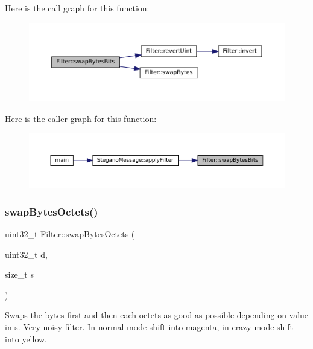 Here is the call graph for this function\+:\nopagebreak
\begin{figure}[H]
\begin{center}
\leavevmode
\includegraphics[width=350pt]{classFilter_a42c3e8f730c64a1bcdf187dc0a09082d_cgraph}
\end{center}
\end{figure}
Here is the caller graph for this function\+:\nopagebreak
\begin{figure}[H]
\begin{center}
\leavevmode
\includegraphics[width=350pt]{classFilter_a42c3e8f730c64a1bcdf187dc0a09082d_icgraph}
\end{center}
\end{figure}
\mbox{\label{classFilter_a55c046859fbbb468536cae5c1f95c702}} 
\subsubsection{\texorpdfstring{swapBytesOctets()}{swapBytesOctets()}}
{\footnotesize\ttfamily uint32\+\_\+t Filter\+::swap\+Bytes\+Octets (\begin{DoxyParamCaption}\item[{uint32\+\_\+t}]{d,  }\item[{size\+\_\+t}]{s }\end{DoxyParamCaption})\hspace{0.3cm}{\ttfamily [static]}}



Swaps the bytes first and then each octets as good as possible depending on value in s. Very noisy filter. In normal mode shift into magenta, in crazy mode shift into yellow. 


